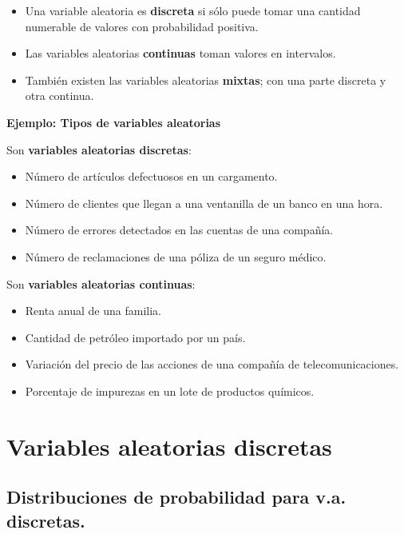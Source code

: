 \documentclass[]{book}
\providecommand{\tightlist}{%
  \setlength{\itemsep}{0pt}\setlength{\parskip}{0pt}}
\begin{document}
\begin{itemize}
\tightlist
\item
  Una variable aleatoria es \textbf{discreta} si sólo puede tomar una cantidad numerable de valores con probabilidad positiva.
\item
  Las variables aleatorias \textbf{continuas} toman valores en intervalos.
\item
  También existen las variables aleatorias \textbf{mixtas}; con una parte discreta y otra continua.
\end{itemize}

\textbf{Ejemplo: Tipos de variables aleatorias}

Son \textbf{variables aleatorias discretas}:

\begin{itemize}
\tightlist
\item
  Número de artículos defectuosos en un cargamento.
\item
  Número de clientes que llegan a una ventanilla de un banco en una hora.
\item
  Número de errores detectados en las cuentas de una compañía.
\item
  Número de reclamaciones de una póliza de un seguro médico.
\end{itemize}

Son \textbf{variables aleatorias continuas}:

\begin{itemize}
\tightlist
\item
  Renta anual de una familia.
\item
  Cantidad de petróleo importado por un país.
\item
  Variación del precio de las acciones de una compañía de telecomunicaciones.
\item
  Porcentaje de impurezas en un lote de productos químicos.
\end{itemize}

\hypertarget{variables-aleatorias-discretas}{%
\section{Variables aleatorias discretas}\label{variables-aleatorias-discretas}}

\hypertarget{distribuciones-de-probabilidad-para-v.a.-discretas.}{%
\subsection{Distribuciones de probabilidad para v.a. discretas.}\label{distribuciones-de-probabilidad-para-v.a.-discretas.}}
\end{document}
